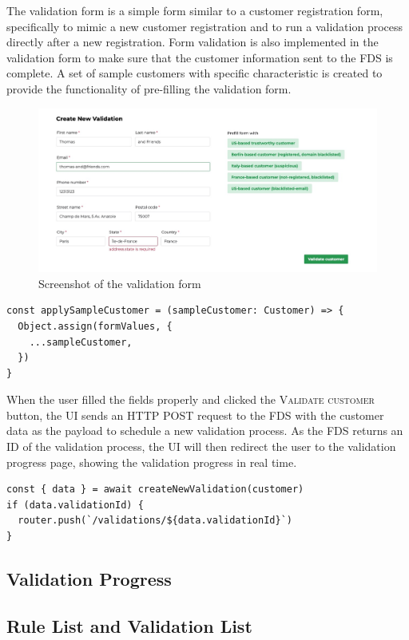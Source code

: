     The validation form is a simple form similar to a customer registration form, specifically to mimic a new customer registration and to run a validation process directly after a new registration. Form validation is also implemented in the validation form to make sure that the customer information sent to the FDS is complete. A set of sample customers with specific characteristic is created to provide the functionality of pre-filling the validation form. 

    \begin{figure}[!ht]
      \includegraphics[width=\textwidth]{images/ss_customer_form.jpeg}
      \caption{Screenshot of the validation form}
    \end{figure}

    \begin{lstlisting}[style=es6, caption={Prefilling form values with a sample customer data (TypeScript)}]
const applySampleCustomer = (sampleCustomer: Customer) => {
  Object.assign(formValues, {
    ...sampleCustomer,
  })
}
    \end{lstlisting}

    When the user filled the fields properly and clicked the \textsc{Validate customer} button, the UI sends an HTTP POST request to the FDS with the customer data as the payload to schedule a new validation process. As the FDS returns an ID of the validation process, the UI will then redirect the user to the validation progress page, showing the validation progress in real time. 

    \begin{lstlisting}[style=es6, caption={ (TypeScript)}]
const { data } = await createNewValidation(customer)
if (data.validationId) {
  router.push(`/validations/${data.validationId}`)
}
    \end{lstlisting}

  \subsection{Validation Progress}
  
    
  
  \subsection{Rule List and Validation List}
